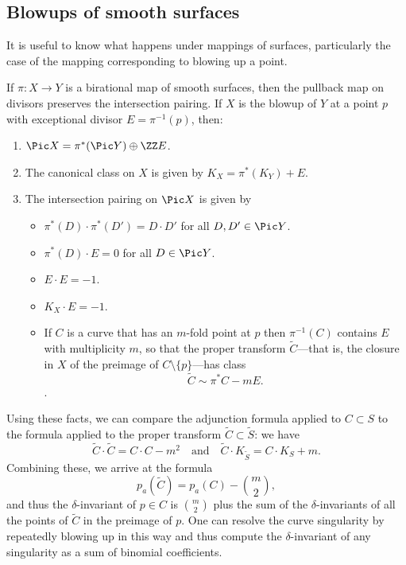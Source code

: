 \subsection{Blowups of smooth surfaces}\label{delta 2} 

It is useful to know what happens under mappings of surfaces, particularly the case of the mapping
corresponding to blowing up a point.

\begin{theorem}\label{divisor classes on blowup}
If $\pi: X \to Y$ is a birational map of smooth surfaces, then the pullback map on divisors
preserves the intersection pairing. If $X$ is the blowup of $Y$ at a point $p$ with exceptional
divisor $E = \pi^{-1}(p)$, then:

\begin{enumerate}
 \item $\Pic X =\pi^*(\Pic Y) \oplus \ZZ E$.
\item The canonical class on $X$ is given by $K_X = \pi^*(K_Y)+E$.
 \item The intersection pairing on $\Pic X$ is given by
 
\begin{itemize}
\item $\pi^*(D)\cdot\pi^*(D') = D\cdot D'$ for all $D,D'\in \Pic Y$.
\item $\pi^*(D)\cdot E = 0$ for all $D\in \Pic Y$.
 \item $E\cdot E = -1$.
 \item $K_X\cdot E = -1$.
 \item If $C$ is a curve that has an $m$-fold point at $p$ then $\pi^{-1}(C)$ contains $E$ with multiplicity $m$, so that the proper transform $\tilde C$---that is, the closure in $X$ of the preimage of $C \setminus \{p\}$---has class
 $$
 \tilde C \sim \pi^*C - mE.
 $$.
 \end{itemize}
\end{enumerate}
\end{theorem}

Using these facts, we can compare the adjunction formula applied to $C \subset S$ to the formula applied to the proper transform $\tilde C \subset \tilde S$: we have
$$
\tilde C \cdot \tilde C = C \cdot C - m^2 \quad \text{and} \quad \tilde C \cdot K_{\tilde S} = C \cdot K_S + m.
$$
Combining these, we arrive at the formula
$$
p_a(\tilde C) = p_a(C) - \binom{m}{2},
$$
and thus the $\delta$-invariant of $p \in C$ is $\binom{m}{2}$ plus the sum of the $\delta$-invariants of all the 
points of $\tilde C$ in the preimage of $p$. One can resolve the curve singularity by repeatedly blowing up in this way and thus compute the $\delta$-invariant
of any singularity as a sum of binomial coefficients.


